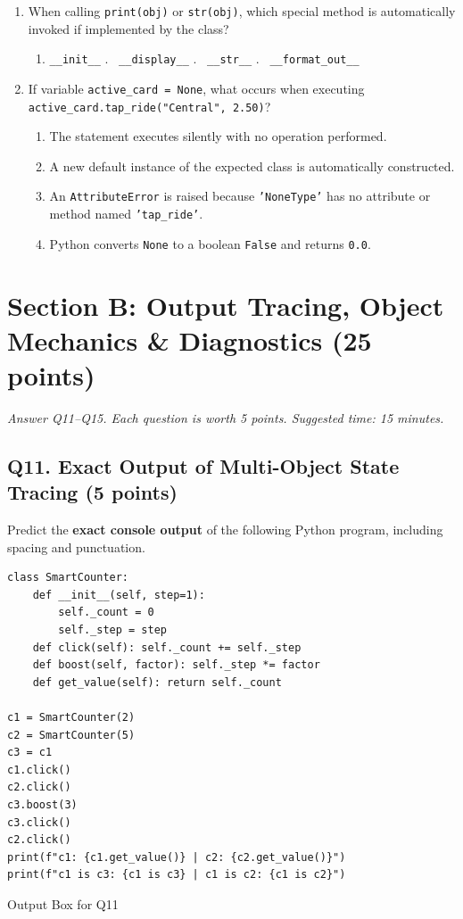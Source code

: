 \documentclass[11pt,a4paper]{article}
\begin{document}
\begin{enumerate}[label=\textbf{Q\arabic*.},leftmargin=2em,itemsep=1.5pt,topsep=1pt,resume]
\begin{enumerate}[label=\Alph*.,leftmargin=2em]
\item Class variables are stored on the call stack, while instance variables are stored in CPU registers.
\end{enumerate}
\item When calling \texttt{print(obj)} or \texttt{str(obj)}, which special method is automatically invoked if implemented by the class?
\begin{enumerate}[label=\Alph*.,leftmargin=2em]
\item \texttt{\_\_init\_\_} \quad \Alph*.~ \texttt{\_\_display\_\_} \quad \Alph*.~ \texttt{\_\_str\_\_} \quad \Alph*.~ \texttt{\_\_format\_out\_\_}
\end{enumerate}
\item If variable \texttt{active\_card = None}, what occurs when executing \texttt{active\_card.tap\_ride("Central", 2.50)}?
\begin{enumerate}[label=\Alph*.,leftmargin=2em]
\item The statement executes silently with no operation performed.
\item A new default instance of the expected class is automatically constructed.
\item An \texttt{AttributeError} is raised because \texttt{'NoneType'} has no attribute or method named \texttt{'tap\_ride'}.
\item Python converts \texttt{None} to a boolean \texttt{False} and returns \texttt{0.0}.
\end{enumerate}
\end{enumerate}
\vspace{-1mm}
\section*{Section B: Output Tracing, Object Mechanics \& Diagnostics \hfill \normalsize\normalfont(25 points)}
\textit{Answer Q11--Q15. Each question is worth 5 points. Suggested time: 15 minutes.}
\subsection*{Q11. Exact Output of Multi-Object State Tracing (5 points)}
Predict the \textbf{exact console output} of the following Python program, including spacing and punctuation.
\begin{lstlisting}
class SmartCounter:
    def __init__(self, step=1):
        self._count = 0
        self._step = step
    def click(self): self._count += self._step
    def boost(self, factor): self._step *= factor
    def get_value(self): return self._count

c1 = SmartCounter(2)
c2 = SmartCounter(5)
c3 = c1
c1.click()
c2.click()
c3.boost(3)
c3.click()
c2.click()
print(f"c1: {c1.get_value()} | c2: {c2.get_value()}")
print(f"c1 is c3: {c1 is c3} | c1 is c2: {c1 is c2}")
\end{lstlisting}
\begin{answerbox}[height=2.7cm]{Output Box for Q11}\end{answerbox}
\newpage
\end{document}
